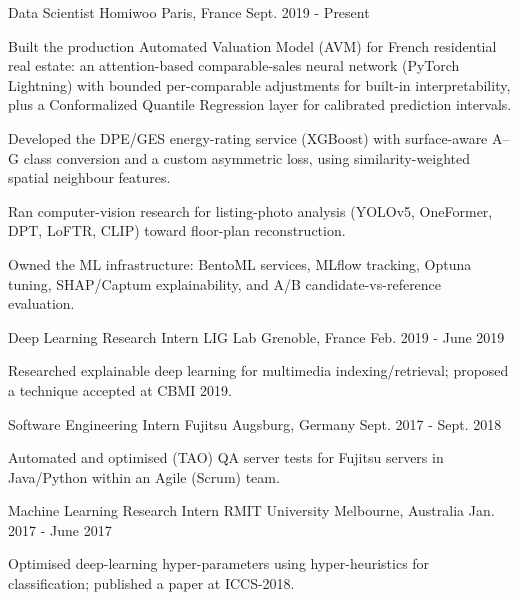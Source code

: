 
\begin{cventries}

  \cventry
    {Data Scientist}
    {Homiwoo}
    {Paris, France}
    {Sept. 2019 - Present}
    {
      \begin{cvitems}
        \item {Built the production Automated Valuation Model (AVM) for French residential real estate: an attention-based comparable-sales neural network (PyTorch Lightning) with bounded per-comparable adjustments for built-in interpretability, plus a Conformalized Quantile Regression layer for calibrated prediction intervals.}
        \item {Developed the DPE/GES energy-rating service (XGBoost) with surface-aware A--G class conversion and a custom asymmetric loss, using similarity-weighted spatial neighbour features.}
        \item {Ran computer-vision research for listing-photo analysis (YOLOv5, OneFormer, DPT, LoFTR, CLIP) toward floor-plan reconstruction.}
        \item {Owned the ML infrastructure: BentoML services, MLflow tracking, Optuna tuning, SHAP/Captum explainability, and A/B candidate-vs-reference evaluation.}
      \end{cvitems}
    }

  \cventry
    {Deep Learning Research Intern}
    {LIG Lab}
    {Grenoble, France}
    {Feb. 2019 - June 2019}
    {
      \begin{cvitems}
        \item {Researched explainable deep learning for multimedia indexing/retrieval; proposed a technique accepted at CBMI 2019.}
      \end{cvitems}
    }

  \cventry
    {Software Engineering Intern}
    {Fujitsu}
    {Augsburg, Germany}
    {Sept. 2017 - Sept. 2018}
    {
      \begin{cvitems}
        \item {Automated and optimised (TAO) QA server tests for Fujitsu servers in Java/Python within an Agile (Scrum) team.}
      \end{cvitems}
    }

  \cventry
    {Machine Learning Research Intern}
    {RMIT University}
    {Melbourne, Australia}
    {Jan. 2017 - June 2017}
    {
      \begin{cvitems}
        \item {Optimised deep-learning hyper-parameters using hyper-heuristics for classification; published a paper at ICCS-2018.}
      \end{cvitems}
    }

\end{cventries}
